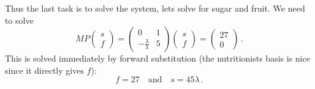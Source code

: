 {Thus the last task is to solve the system, lets solve for sugar and fruit. 
We need to solve
$$
MP\begin{pmatrix} s \\  f\end{pmatrix}
=\begin{pmatrix}0& 1\\ -\frac3\lambda & 5
\end{pmatrix}
\begin{pmatrix} s \\  f\end{pmatrix}
=\begin{pmatrix}27\\0\end{pmatrix}
\, .
$$
This is solved immediately by forward substitution (the nutritionists basis is nice since it directly gives $f$):
$$
f=27\quad \mbox{and} \quad s= 45\lambda\, .
$$

} %

